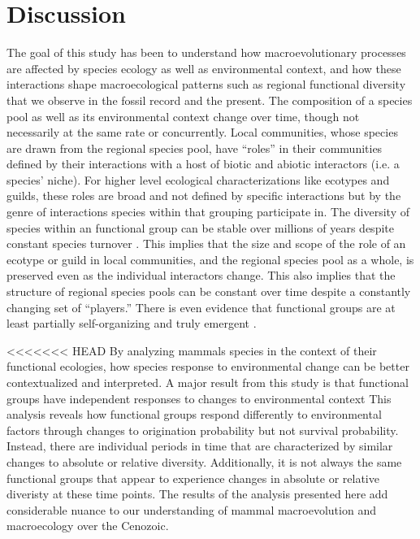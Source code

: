 \documentclass[12pt,letterpaper]{article}
\begin{document}
\section*{Discussion}

The goal of this study has been to understand how macroevolutionary processes are affected by species ecology as well as environmental context, and how these interactions shape macroecological patterns such as regional functional diversity that we observe in the fossil record and the present. The composition of a species pool as well as its environmental context change over time, though not necessarily at the same rate or concurrently. Local communities, whose species are drawn from the regional species pool, have ``roles'' in their communities defined by their interactions with a host of biotic and abiotic interactors (i.e. a species' niche). For higher level ecological characterizations like ecotypes and guilds, these roles are broad and not defined by specific interactions but by the genre of interactions species within that grouping participate in. The diversity of species within an functional group can be stable over millions of years despite constant species turnover \citep{Jernvall2004,Slater2015c,Valkenburgh1999}. This implies that the size and scope of the role of an ecotype or guild in local communities, and the regional species pool as a whole, is preserved even as the individual interactors change. This also implies that the structure of regional species pools can be constant over time despite a constantly changing set of ``players.'' There is even evidence that functional groups are at least partially self-organizing and truly emergent \citep{Scheffer2006a}.

<<<<<<< HEAD
By analyzing mammals species in the context of their functional ecologies, how species response to environmental change can be better contextualized and interpreted. A major result from this study is that functional groups have independent responses to changes to environmental context
This analysis reveals how functional groups respond differently to environmental factors through changes to origination probability but not survival probability. Instead, there are individual periods in time that are characterized by similar changes to absolute or relative diversity. Additionally, it is not always the same functional groups that appear to experience changes in absolute or relative diveristy at these time points. The results of the analysis presented here add considerable nuance to our understanding of mammal macroevolution and macroecology over the Cenozoic. 
\end{document}
